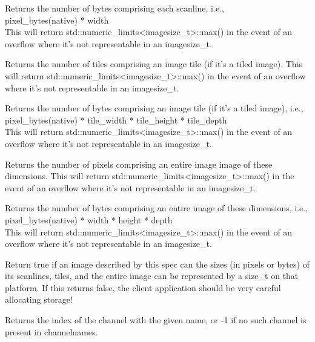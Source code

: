 Returns the number of bytes comprising each scanline,
i.e., \\ {\cf pixel_bytes(native) * width} \\
This will return {\cf std::numeric_limits<imagesize_t>::max()} in the event
of an overflow where it's not representable in an {\cf imagesize_t}.
\apiend

Returns the number of tiles comprising an image tile (if it's a tiled image).
This will return {\cf std::numeric_limits<imagesize_t>::max()} in the event
of an overflow where it's not representable in an {\cf imagesize_t}.
\apiend

Returns the number of bytes comprising an image tile (if it's a tiled
image), i.e., \\ {\cf pixel_bytes(native) * tile_width * tile_height * tile_depth } \\
This will return {\cf std::numeric_limits<imagesize_t>::max()} in the event
of an overflow where it's not representable in an {\cf imagesize_t}.
\apiend

Returns the number of pixels comprising an entire image image of these dimensions.
This will return {\cf std::numeric_limits<imagesize_t>::max()} in the event
of an overflow where it's not representable in an {\cf imagesize_t}.
\apiend

Returns the number of bytes comprising an entire image of these
dimensions, i.e., \\
{\cf pixel_bytes(native) * width * height * depth } \\
This will return {\cf std::numeric_limits<imagesize_t>::max()} in the event
of an overflow where it's not representable in an {\cf imagesize_t}.
\apiend

Return {\cf true} if an image described by this spec can the sizes
(in pixels or bytes) of its scanlines, tiles, and the entire image can
be represented by a {\cf size_t} on that platform.  If this returns
{\cf false}, the client application should be very careful allocating
storage!
\apiend

Returns the index of the channel with the given name, or -1 if no such
channel is present in {\cf channelnames}.
\apiend

